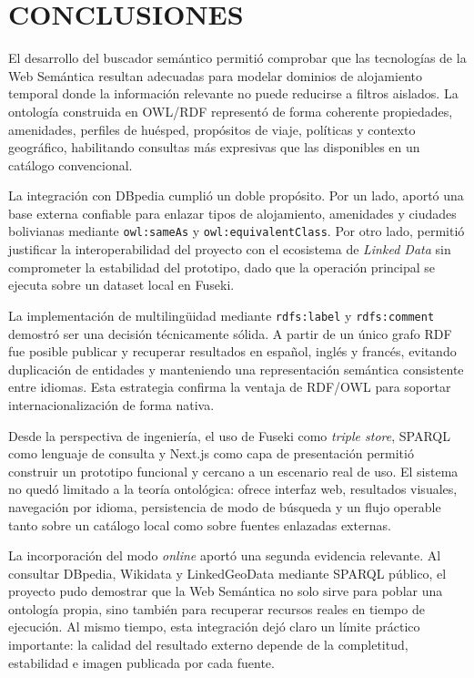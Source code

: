\section{CONCLUSIONES}

El desarrollo del buscador semántico permitió comprobar que las tecnologías de la Web
Semántica resultan adecuadas para modelar dominios de alojamiento temporal donde la
información relevante no puede reducirse a filtros aislados. La ontología construida en
OWL/RDF representó de forma coherente propiedades, amenidades, perfiles de huésped,
propósitos de viaje, políticas y contexto geográfico, habilitando consultas más
expresivas que las disponibles en un catálogo convencional.

La integración con DBpedia cumplió un doble propósito. Por un lado, aportó una base
externa confiable para enlazar tipos de alojamiento, amenidades y ciudades bolivianas
mediante \texttt{owl:sameAs} y \texttt{owl:equivalentClass}. Por otro lado, permitió
justificar la interoperabilidad del proyecto con el ecosistema de \textit{Linked Data}
sin comprometer la estabilidad del prototipo, dado que la operación principal se ejecuta
sobre un dataset local en Fuseki.

La implementación de multilingüidad mediante \texttt{rdfs:label} y
\texttt{rdfs:comment} demostró ser una decisión técnicamente sólida. A partir de un
único grafo RDF fue posible publicar y recuperar resultados en español, inglés y
francés, evitando duplicación de entidades y manteniendo una representación semántica
consistente entre idiomas. Esta estrategia confirma la ventaja de RDF/OWL para soportar
internacionalización de forma nativa.

Desde la perspectiva de ingeniería, el uso de Fuseki como \textit{triple store}, SPARQL
como lenguaje de consulta y Next.js como capa de presentación permitió construir un
prototipo funcional y cercano a un escenario real de uso. El sistema no quedó limitado
a la teoría ontológica: ofrece interfaz web, resultados visuales, navegación por idioma,
persistencia de modo de búsqueda y un flujo operable tanto sobre un catálogo local como
sobre fuentes enlazadas externas.

La incorporación del modo \textit{online} aportó una segunda evidencia relevante. Al
consultar DBpedia, Wikidata y LinkedGeoData mediante SPARQL público, el proyecto pudo
demostrar que la Web Semántica no solo sirve para poblar una ontología propia, sino
también para recuperar recursos reales en tiempo de ejecución. Al mismo tiempo, esta
integración dejó claro un límite práctico importante: la calidad del resultado externo
depende de la completitud, estabilidad e imagen publicada por cada fuente.

